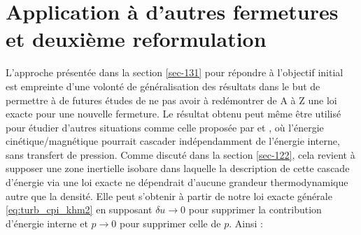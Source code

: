 \section{ Application à d'autres fermetures et deuxième reformulation}
\label{sec-133}

L'approche présentée dans la section \ref{sec-131} pour répondre à l'objectif initial est empreinte d'une volonté de généralisation des résultats dans le but de permettre à de futures études de ne pas avoir à redémontrer de A à Z une loi exacte pour une nouvelle fermeture. Le résultat obtenu peut même être utilisé pour étudier d'autres situations comme celle proposée par  \cite{aluie_conservative_2012} et \cite{hellinger_spectral_2021}, où l'énergie cinétique/magnétique pourrait cascader indépendamment de l'énergie interne, sans transfert de pression. Comme discuté dans la section \ref{sec-122}, cela revient à supposer une zone inertielle isobare dans laquelle la description de cette cascade d'énergie via une loi exacte ne dépendrait d'aucune grandeur thermodynamique autre que la densité. Elle peut s'obtenir à partir de notre loi exacte générale \eqref{eq:turb_cpi_khm2} en supposant $\delta u \rightarrow 0$ pour supprimer la contribution d'énergie interne et $p \rightarrow 0$ pour supprimer celle de $p$. Ainsi : 
